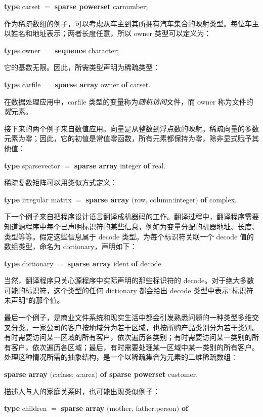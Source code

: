 \documentclass[twoside,11pt,fontset=none]{ctexbook}
\begin{document}
\quad \textbf{type} carset $=$ \textbf{sparse powerset} carnumber;

作为稀疏数组的例子，可以考虑从车主到其所拥有汽车集合的映射类型。每位车主以姓名和地址表示；两者长度任意，所以 owner 类型可以定义为：

\quad \textbf{type} owner $=$ \textbf{sequence} character;

\noindent
它的基数无限。因此，所需类型声明为稀疏类型：

\quad \textbf{type} carfile $=$ \textbf{sparse array} owner \textbf{of} carset.

在数据处理应用中，carfile 类型的变量称为\textit{随机访问}文件，而 owner 称为文件的\textit{键}元素。

接下来的两个例子来自数值应用。向量是从整数到浮点数的映射。稀疏向量的多数元素为零；因此，它的初值是常值零函数，所有元素都保持为零，除非显式赋予其他值：

\quad \textbf{type} sparsevector $=$ \textbf{sparse array} integer \textbf{of} real.

\noindent
稀疏复数矩阵可以用类似方式定义：

\quad \textbf{type} irregular matrix $=$ \textbf{sparse array} $($row, column:integer$)$ \textbf{of} complex.

下一个例子来自把程序设计语言翻译成机器码的工作。翻译过程中，翻译程序需要知道源程序中每个已声明标识符的某些信息，例如为变量分配的机器地址、长度、类型等等。假定这些信息属于 decode 类型。为每个标识符关联一个 decode 值的数组类型，命名为 dictionary，声明如下：

\quad \textbf{type} dictionary $=$ \textbf{sparse array} ident \textbf{of} decode

\noindent
当然，翻译程序只关心源程序中实际声明的那些标识符的 decode。对于绝大多数可能的标识符，这个类型的任何 dictionary 都会给出 decode 类型中表示“标识符未声明”的那个值。

最后一个例子，是商业文件系统和现实生活中都会引发熟悉问题的一种类型\textemdash{}多维交叉分类。一家公司的客户按地域分为若干区域，也按所购产品类别分为若干类别。有时需要访问某一区域的所有客户，依次遍历各类别；有时需要访问某一类别的所有客户，依次遍历各区域；最后，有时需要处理某一区域中某一类别的所有客户。处理这种情况所需的抽象结构，是一个以稀疏集合为元素的二维稀疏数组：

\quad \textbf{sparse array} $(c$:class; $a$:area$)$ \textbf{of sparse powerset} customer.

描述人与人的家庭关系时，也可能出现类似例子：

\quad \textbf{type} children $=$ \textbf{sparse array} $($mother, father:person$)$ \textbf{of} 
\end{document}

